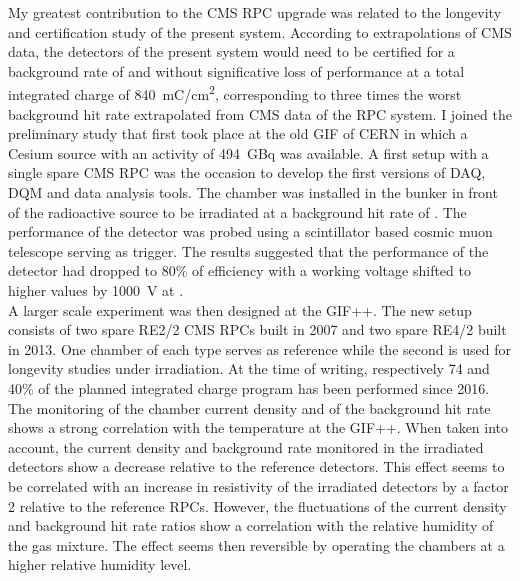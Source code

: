 	My greatest contribution to the CMS RPC upgrade was related to the longevity and certification study of the present system. According to extrapolations of CMS data, the detectors of the present system would need to be certified for a background rate of  and without significative loss of performance at a total integrated charge of \SI{840}{mC/cm^2}, corresponding to three times the worst background hit rate extrapolated from CMS data of the RPC system. I joined the preliminary study that first took place at the old \acl{GIF} of CERN in which a Cesium source with an activity of \SI{494}{GBq} was available. A first setup with a single spare CMS RPC was the occasion to develop the first versions of \acl{DAQ}, \acl{DQM} and data analysis tools. The chamber was installed in the bunker in front of the radioactive source to be irradiated at a background hit rate of . The performance of the detector was probed using a scintillator based cosmic muon telescope serving as trigger. The results suggested that the performance of the detector had dropped to 80\% of efficiency with a working voltage shifted to higher values by \SI{1000}{V} at .\\
	A larger scale experiment was then designed at the GIF++. The new setup consists of two spare RE2/2 CMS RPCs built in 2007 and two spare RE4/2 built in 2013. One chamber of each type serves as reference while the second is used for longevity studies under irradiation. At the time of writing, respectively 74 and 40\% of the planned integrated charge program has been performed since 2016. The monitoring of the chamber current density and of the background hit rate shows a strong correlation with the temperature at the GIF++. When taken into account, the current density and background rate monitored in the irradiated detectors show a decrease relative to the reference detectors. This effect seems to be correlated with an increase in resistivity of the irradiated detectors by a factor 2 relative to the reference RPCs. However, the fluctuations of the current density and background hit rate ratios show a correlation with the relative humidity of the gas mixture. The effect seems then reversible by operating the chambers at a higher relative humidity level.\\
